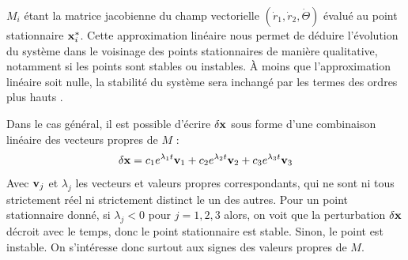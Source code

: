 %
$M_i$ étant la matrice jacobienne du champ vectorielle $(\dot{r}_1, \dot{r}_2, \dot{\Theta})$ évalué au point stationnaire $\vb{x}^*_i$.
%
Cette approximation linéaire nous permet de déduire l'évolution du système dans le voisinage des points stationnaires de manière qualitative, notamment si les points sont stables ou instables. 
À moins que l'approximation linéaire soit nulle, la stabilité du système sera inchangé par les termes des ordres plus hauts \cite{strogatz_nonlinear_2015}.
%
%
%

Dans le cas général, il est possible d'écrire $\delta\vb{x}$ sous forme d'une combinaison linéaire des vecteurs propres de $M$ :
%
\[ \delta\vb{x} = c_1 e^{\lambda_1 t}\vb{v}_1 + c_2 e^{\lambda_2 t}\vb{v}_2 + c_3 e^{\lambda_3 t}\vb{v}_3\]
%
Avec $\vb{v}_j$ et $\lambda_j$ les vecteurs et valeurs propres correspondants, qui ne sont ni tous strictement réel ni strictement distinct le un des autres.
%
Pour un point stationnaire donné, si $\lambda_j < 0$ pour $j = 1, 2, 3$ alors, on voit que la perturbation $\delta\vb{x}$ décroit avec le temps, donc le point stationnaire est stable. Sinon, le point est instable.
%
On s'intéresse donc surtout aux signes des valeurs propres de $M$.
%

